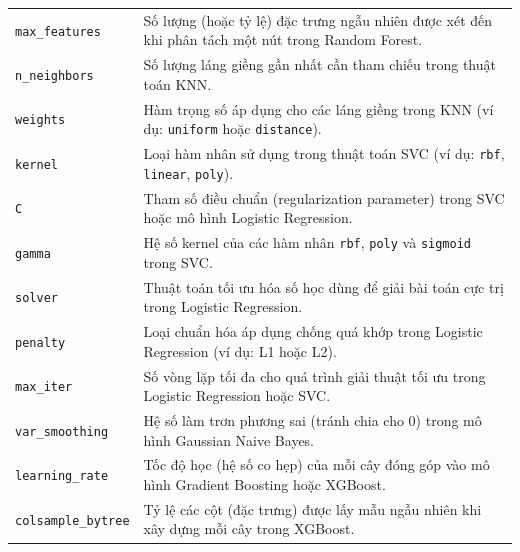 \documentclass[12pt,a4paper]{article}
\begin{document}
\begin{longtable}{p{} p{}}
\texttt{max\_features} & Số lượng (hoặc tỷ lệ) đặc trưng ngẫu nhiên được xét đến khi phân tách một nút trong Random Forest. \\
\texttt{n\_neighbors} & Số lượng láng giềng gần nhất cần tham chiếu trong thuật toán KNN. \\
\texttt{weights} & Hàm trọng số áp dụng cho các láng giềng trong KNN (ví dụ: \texttt{uniform} hoặc \texttt{distance}). \\
\texttt{kernel} & Loại hàm nhân sử dụng trong thuật toán SVC (ví dụ: \texttt{rbf}, \texttt{linear}, \texttt{poly}). \\
\texttt{C} & Tham số điều chuẩn (regularization parameter) trong SVC hoặc mô hình Logistic Regression. \\
\texttt{gamma} & Hệ số kernel của các hàm nhân \texttt{rbf}, \texttt{poly} và \texttt{sigmoid} trong SVC. \\
\texttt{solver} & Thuật toán tối ưu hóa số học dùng để giải bài toán cực trị trong Logistic Regression. \\
\texttt{penalty} & Loại chuẩn hóa áp dụng chống quá khớp trong Logistic Regression (ví dụ: L1 hoặc L2). \\
\texttt{max\_iter} & Số vòng lặp tối đa cho quá trình giải thuật tối ưu trong Logistic Regression hoặc SVC. \\
\texttt{var\_smoothing} & Hệ số làm trơn phương sai (tránh chia cho 0) trong mô hình Gaussian Naive Bayes. \\
\texttt{learning\_rate} & Tốc độ học (hệ số co hẹp) của mỗi cây đóng góp vào mô hình Gradient Boosting hoặc XGBoost. \\
\texttt{colsample\_bytree} & Tỷ lệ các cột (đặc trưng) được lấy mẫu ngẫu nhiên khi xây dựng mỗi cây trong XGBoost. \\
\end{longtable}
\end{document}
